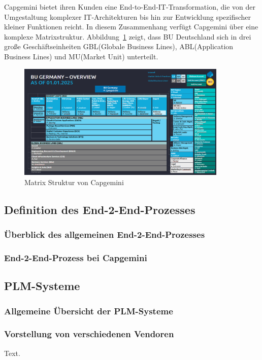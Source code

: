\documentclass[a4paper, 12pt]{scrartcl}
\begin{document}
Capgemini bietet ihren Kunden eine End-to-End-IT-Transformation, die von der Umgestaltung komplexer IT-Architekturen bis hin zur Entwicklung spezifischer kleiner Funktionen reicht. In diesem Zusammenhang verfügt Capgemini über eine komplexe Matrixstruktur. Abbildung~\ref{fig:Matrix Struktur} zeigt, dass BU Deutschland sich in drei große Geschäftseinheiten GBL(Globale Business Lines), ABL(Application Business Lines) und MU(Market Unit) unterteilt.
	\begin{figure}[h!]
	\begin{center}
		\includegraphics[width=10cm]{BU Germany CAP.png}
		\caption{Matrix Struktur von Capgemini}
		\label{fig:Matrix Struktur}
	\end{center}
\end{figure}
	\newpage
	\subsection{Definition des End-2-End-Prozesses}
	\subsubsection{Überblick des allgemeinen End-2-End-Prozesses} %
	\subsubsection{End-2-End-Prozess bei Capgemini}
	\subsection{PLM-Systeme}
	\subsubsection{Allgemeine Übersicht der PLM-Systeme}
	\subsubsection{Vorstellung von verschiedenen Vendoren}
	Text.
	\newpage
\end{document}
